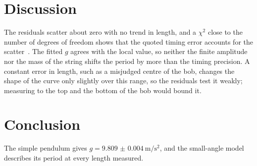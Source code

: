 \documentclass[11pt]{article}
\begin{document}
\section{Discussion}

The residuals scatter about zero with no trend in length, and a $\chi^2$ close to the number of degrees of freedom shows that the quoted timing error accounts for the scatter~\cite{taylor1997}. The fitted $g$ agrees with the local value, so neither the finite amplitude nor the mass of the string shifts the period by more than the timing precision. A constant error in length, such as a misjudged centre of the bob, changes the shape of the curve only slightly over this range, so the residuals test it weakly; measuring to the top and the bottom of the bob would bound it.

\section{Conclusion}

The simple pendulum gives $g = \qty{9.809(4)}{\metre\per\second\squared}$, and the small-angle model describes its period at every length measured.



\end{document}
